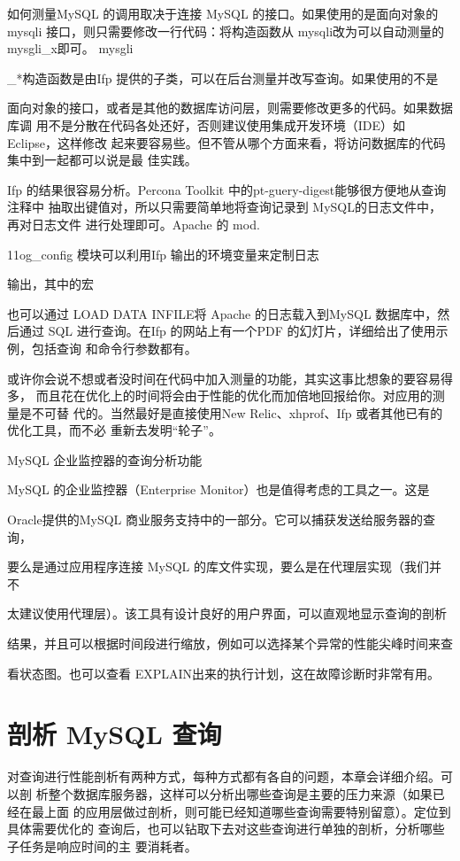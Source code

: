如何测量MySQL 的调用取决于连接 MySQL 的接口。如果使用的是面向对象的mysqli
接口，则只需要修改一行代码：将构造函数从 mysqli改为可以自动测量的mysgli\_x即可。
mysgli

\_*构造函数是由Ifp 提供的子类，可以在后台测量并改写查询。如果使用的不是

面向对象的接口，或者是其他的数据库访问层，则需要修改更多的代码。如果数据库调
用不是分散在代码各处还好，否则建议使用集成开发环境（IDE）如Eclipse，这样修改
起来要容易些。但不管从哪个方面来看，将访问数据库的代码集中到一起都可以说是最
佳实践。

Ifp 的结果很容易分析。Percona Toolkit 中的pt-guery-digest能够很方便地从查询注释中
抽取出键值对，所以只需要简单地将查询记录到 MySQL的日志文件中，再对日志文件
进行处理即可。Apache 的 mod.

11og\_config 模块可以利用Ifp 输出的环境变量来定制日志

输出，其中的宏%

也可以通过 LOAD DATA INFILE将 Apache 的日志载入到MySQL 数据库中，然后通过
SQL 进行查询。在Ifp 的网站上有一个PDF 的幻灯片，详细给出了使用示例，包括查询
和命令行参数都有。

或许你会说不想或者没时间在代码中加入测量的功能，其实这事比想象的要容易得多，
而且花在优化上的时间将会由于性能的优化而加倍地回报给你。对应用的测量是不可替
代的。当然最好是直接使用New Relic、xhprof、Ifp 或者其他已有的优化工具，而不必
重新去发明“轮子”。

MySQL 企业监控器的查询分析功能

MySQL 的企业监控器（Enterprise Monitor）也是值得考虑的工具之一。这是

Oracle提供的MySQL 商业服务支持中的一部分。它可以捕获发送给服务器的查询，

要么是通过应用程序连接 MySQL 的库文件实现，要么是在代理层实现（我们并不

太建议使用代理层）。该工具有设计良好的用户界面，可以直观地显示查询的剖析

结果，并且可以根据时间段进行缩放，例如可以选择某个异常的性能尖峰时间来查

看状态图。也可以查看 EXPLAIN出来的执行计划，这在故障诊断时非常有用。

\section{剖析 MySQL 查询}
对查询进行性能剖析有两种方式，每种方式都有各自的问题，本章会详细介绍。可以剖
析整个数据库服务器，这样可以分析出哪些查询是主要的压力来源（如果已经在最上面
的应用层做过剖析，则可能已经知道哪些查询需要特别留意）。定位到具体需要优化的
查询后，也可以钻取下去对这些查询进行单独的剖析，分析哪些子任务是响应时间的主
要消耗者。

